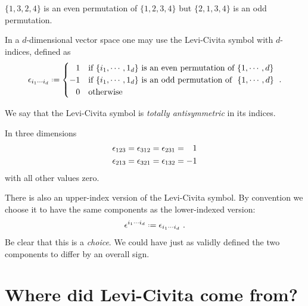 \documentclass[12pt, oneside]{report}    %
\newenvironment{wide}{\begin{adjustwidth}{0cm}{-6.25cm}}{\end{adjustwidth}}
\let\oldsection\section
\def\section{%
  \setcounter{sidenote}{1}%
  \oldsection
}
\begin{document}
\begin{example}
$\{1,3,2,4\}$ is an even permutation of $\{1,2,3,4\}$ but $\{2,1,3,4\}$ is an odd permutation.
\end{example}


\begin{wide}
In a $d$-dimensional vector space one may use the Levi-Civita symbol with $d$-indices, defined as
\begin{align}
    \epsilon_{i_1\cdots i_d} \defeq 
    \begin{cases}
    \pp 1 &\text{if }\{i_1,\cdots, 1_d\}\text{ is an even permutation of }\{1,\cdots, d\}\\
    -1 &\text{if }\{i_1,\cdots, 1_d\}\text{ is an odd permutation of }\ \{1,\cdots, d\}\\
    \pp 0 &\text{otherwise}
    \end{cases} \ .
    \label{eq:Levi:Civita:symbol:definition:d:dim}
\end{align}
\end{wide}
We say that the Levi-Civita symbol is \emph{totally antisymmetric} in its indices.

\begin{example}
In three dimensions
\begin{align}
\epsilon_{123} &=
\epsilon_{312} = 
\epsilon_{231} = \pp 1
\\
\epsilon_{213} &= 
\epsilon_{321} = 
\epsilon_{132} = -1 
\end{align}
with all other values zero.
\end{example}

There is also an upper-index version of the Levi-Civita symbol. By convention we choose it to have the same components as the lower-indexed version:
\begin{align}
    \epsilon^{i_1\cdots i_d}
    \defeq
    \epsilon_{i_1\cdots i_d} \ .
    \label{eq:def:levi:civita:d:dim:upper}
\end{align}
Be clear that this is a \emph{choice}. We could have just as validly defined the two components to differ by an overall sign.

\section{Where did Levi-Civita come from?} 
\end{document}
